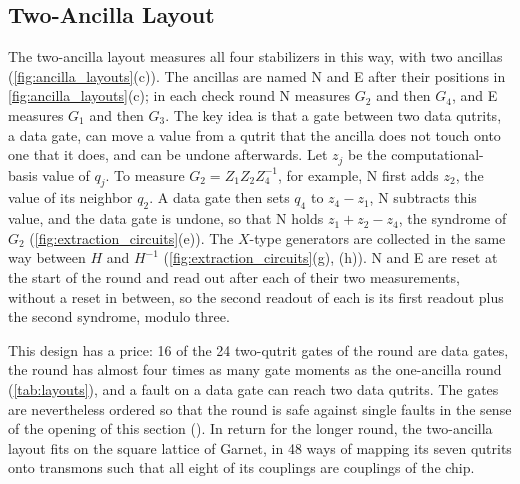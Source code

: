 \subsection{Two-Ancilla Layout}
\label{sub:layout_two}

The two-ancilla layout measures all four stabilizers in this way, with two ancillas (\autoref{fig:ancilla_layouts}(c)). The ancillas are named N and E after their positions in \autoref{fig:ancilla_layouts}(c); in each check round N measures $G_2$ and then $G_4$, and E measures $G_1$ and then $G_3$. The key idea is that a gate between two data qutrits, a data gate, can move a value from a qutrit that the ancilla does not touch onto one that it does, and can be undone afterwards. Let $z_j$ be the computational-basis value of $q_j$. To measure $G_2 = Z_1 Z_2 Z_4^{-1}$, for example, N first adds $z_2$, the value of its neighbor $q_2$. A data gate then sets $q_4$ to $z_4 - z_1$, N subtracts this value, and the data gate is undone, so that N holds $z_1 + z_2 - z_4$, the syndrome of $G_2$ (\autoref{fig:extraction_circuits}(e)). The $X$-type generators are collected in the same way between $H$ and $H^{-1}$ (\autoref{fig:extraction_circuits}(g), (h)). N and E are reset at the start of the round and read out after each of their two measurements, without a reset in between, so the second readout of each is its first readout plus the second syndrome, modulo three.

This design has a price: 16 of the 24 two-qutrit gates of the round are data gates, the round has almost four times as many gate moments as the one-ancilla round (\autoref{tab:layouts}), and a fault on a data gate can reach two data qutrits. The gates are nevertheless ordered so that the round is safe against single faults in the sense of the opening of this section (). In return for the longer round, the two-ancilla layout fits on the square lattice of Garnet, in 48 ways of mapping its seven qutrits onto transmons such that all eight of its couplings are couplings of the chip.
